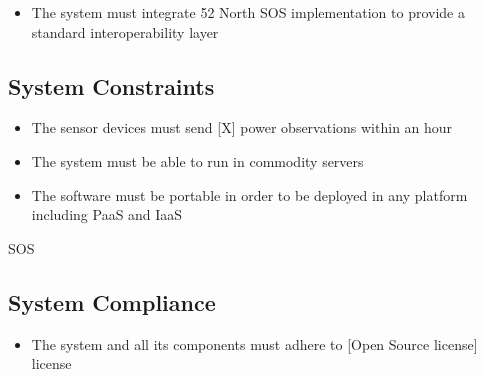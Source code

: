 \begin{itemize}
	\item The system must integrate 52 North SOS implementation to provide a standard interoperability layer
\end{itemize}

\subsection{System Constraints}

\begin{itemize}
	\item The sensor devices must send [X] power observations within an hour
	\item The system must be able to run in commodity servers 
	\item The software must be portable in order to be deployed in any platform including PaaS and IaaS
\end{itemize}

SOS

\subsection{System Compliance}

\begin{itemize}
	\item The system and all its components must adhere to [Open Source license] license
\end{itemize}


